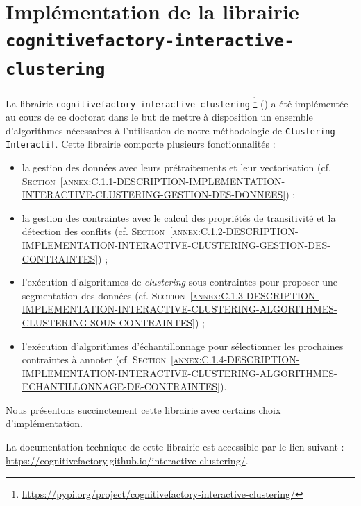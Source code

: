 \section[
		\texttt{cognitivefactory-interactive-clustering}
	]{
		Implémentation de la librairie \\ \texttt{cognitivefactory-interactive-clustering}
	}
\label{annex:C.1-DESCRIPTION-IMPLEMENTATION-INTERACTIVE-CLUSTERING}
	
	La librairie \texttt{cognitivefactory-interactive-clustering} \footnote{
		\url{https://pypi.org/project/cognitivefactory-interactive-clustering/}
	} (\cite{schild:2022:cognitivefactory-interactiveclustering}) a été implémentée au cours de ce doctorat dans le but de mettre à disposition un ensemble d'algorithmes nécessaires à l'utilisation de notre méthodologie de \texttt{Clustering Interactif}.
	Cette librairie comporte plusieurs fonctionnalités :
	\begin{itemize}
		\item la gestion des données avec leurs prétraitements et leur vectorisation (cf. \textsc{Section~\ref{annex:C.1.1-DESCRIPTION-IMPLEMENTATION-INTERACTIVE-CLUSTERING-GESTION-DES-DONNEES}}) ;
		\item la gestion des contraintes avec le calcul des propriétés de transitivité et la détection des conflits (cf. \textsc{Section~\ref{annex:C.1.2-DESCRIPTION-IMPLEMENTATION-INTERACTIVE-CLUSTERING-GESTION-DES-CONTRAINTES}}) ;
		\item l'exécution d'algorithmes de \textit{clustering} sous contraintes pour proposer une segmentation des données (cf. \textsc{Section~\ref{annex:C.1.3-DESCRIPTION-IMPLEMENTATION-INTERACTIVE-CLUSTERING-ALGORITHMES-CLUSTERING-SOUS-CONTRAINTES}}) ;
		\item l'exécution d'algorithmes d'échantillonnage pour sélectionner les prochaines contraintes à annoter (cf. \textsc{Section~\ref{annex:C.1.4-DESCRIPTION-IMPLEMENTATION-INTERACTIVE-CLUSTERING-ALGORITHMES-ECHANTILLONNAGE-DE-CONTRAINTES}}).
	\end{itemize}
	
	Nous présentons succinctement cette librairie avec certains choix d'implémentation.
	
	\begin{leftBarInformation}
		La documentation technique de cette librairie est accessible par le lien suivant : \url{https://cognitivefactory.github.io/interactive-clustering/}.
	\end{leftBarInformation}
	
